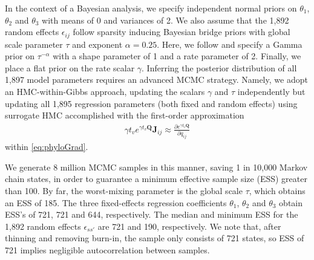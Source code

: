 \documentclass[9pt,twocolumn,twoside]{pnas-new}
\newcommand{\?}{\textbf{?}}
\newcommand{\QQ}{\mathbf{Q}}
\newcommand{\JJ}{\mathbf{J}}
\begin{document}
In the context of a Bayesian analysis, we specify independent normal
priors on $\theta_1$, $\theta_2$ and $\theta_3$ with means of 0 and
variances of 2.  We also assume that the 1,892 random effects
$\epsilon_{ij}$ follow sparsity inducing Bayesian bridge priors with
global scale parameter $\tau$ and exponent $\alpha=0.25$.  Here, we
follow \cite{nishimura2022shrinkage} and specify a Gamma prior on
$\tau^{-\alpha}$ with a shape parameter of 1 and a rate parameter of
2. Finally, we place a flat prior on the rate scalar $\gamma$.
Inferring the posterior distribution of all 1,897 model parameters
requires an advanced MCMC strategy. Namely, we adopt an
HMC-within-Gibbs approach, updating the scalars $\gamma$ and $\tau$
independently but updating all 1,895 regression parameters (both fixed
and random effects) using surrogate HMC accomplished with the
first-order approximation
\begin{align*}
  \gamma t_v  e^{\gamma t_v \QQ} \JJ_{ij}
  \approx \frac{\partial e^{\gamma t_v \QQ}}{\partial q_{ij}} 
\end{align*}
within \eqref{eq:phyloGrad}.

We generate 8 million MCMC samples in this manner, saving 1 in 10,000
Markov chain states, in order to guarantee a minimum effective sample
size (ESS) greater than 100.  By far, the worst-mixing parameter is
the global scale $\tau$, which obtains an ESS of 185.  The three
fixed-effects regression coefficients $\theta_1$, $\theta_2$ and
$\theta_3$ obtain ESS's of 721, 721 and 644, respectively.  The median
and minimum ESS for the 1,892 random effects $\epsilon_{ss'}$ are 721
and 190, respectively.  We note that, after thinning and removing
burn-in, the sample only consists of 721 states, so ESS of 721 implies
negligible autocorrelation between samples.
\end{document}
